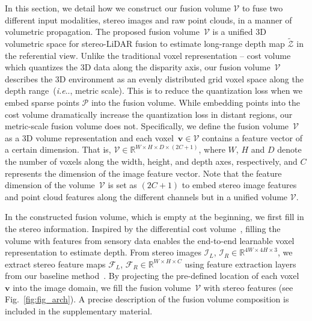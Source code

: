 \documentclass[letterpaper, 10 pt, conference]{ieeeconf}
\makeatletter
\DeclareRobustCommand\onedot{\futurelet\@let@token\@onedot}
\def\@onedot{\ifx\@let@token.\else.\null\fi\xspace}
\def\ie{\emph{i.e}\onedot} \def\Ie{{I.e}\onedot}
\newcommand{\Fref}[1]{Fig.~\textcolor{blue}{\ref{#1}}}
\makeatother
\begin{document}
In this section, we detail how we construct our fusion volume $\mathcal{V}$ to fuse two different input modalities, stereo images and raw point clouds, in a manner of volumetric propagation. The proposed fusion volume~$\mathcal{V}$ is a unified 3D volumetric space for stereo-LiDAR fusion to estimate long-range depth map $\widetilde{\mathcal{Z}}$ in the referential view. Unlike the traditional voxel representation -- cost volume~\cite{gcnet,psmnet,ganet} which quantizes the 3D data along the disparity axis, 
our fusion volume~$\mathcal{V}$ describes the 3D environment as an evenly distributed grid voxel space along the depth range~(\ie, metric scale). This is to reduce the quantization loss when we embed sparse points $\mathcal{P}$ into the fusion volume. While embedding points into the cost volume dramatically increase the quantization loss in distant regions, our metric-scale fusion volume does not. Specifically, we define the fusion volume~$\mathcal{V}$ as a 3D volume representation and each voxel~$\mathbf{v} \in \mathcal{V}$  contains a feature vector of a certain dimension. That is, $\mathcal{V} \in \mathbb{R}^{W \times H \times D \times (2C+1)}$, where $W$, $H$ and $D$ denote the number of voxels along the width, height, and depth axes, respectively, and $C$ represents the dimension of the image feature vector. Note that the feature dimension of the volume~$\mathcal{V}$ is set as $(2C+1)$ to embed stereo image features and point cloud features along the different channels but in a unified volume $\mathcal{V}$.



In the constructed fusion volume, which is empty at the beginning, we first fill in the stereo information. Inspired by the differential cost volume~\cite{gcnet,psmnet}, filling the volume with features from sensory data enables the end-to-end learnable voxel representation to estimate depth. From stereo images $\mathcal{I}_{L}$, $\mathcal{I}_{R} \in \mathbb{R}^{4W \times 4H \times 3}$, we extract stereo feature maps $\mathcal{F}_{L}$, $\mathcal{F}_{R} \in \mathbb{R}^{W \times H \times C}$ using feature extraction layers from our baseline method~\cite{psmnet}. By projecting the pre-defined location of each voxel~$\mathbf{v}$ into the image domain, we fill the fusion volume~$\mathcal{V}$ with stereo features (see \Fref{fig:fig_arch}). A precise description of the fusion volume composition is included in the supplementary material.
\end{document}
